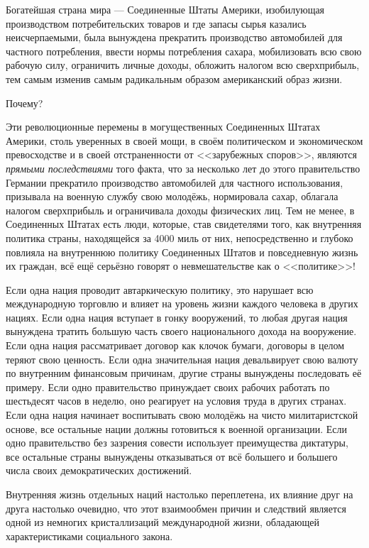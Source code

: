 Богатейшая страна мира — Соединенные Штаты Америки, изобилующая производством потребительских товаров и где запасы сырья казались неисчерпаемыми, была вынуждена прекратить производство автомобилей для частного потребления, ввести нормы потребления сахара, мобилизовать всю свою рабочую силу, ограничить личные доходы, обложить налогом всю сверхприбыль, тем самым изменив самым радикальным образом американский образ жизни.
 
Почему?

Эти революционные перемены в могущественных Соединенных Штатах Америки, столь уверенных в своей мощи, в своём политическом и экономическом превосходстве и в своей отстраненности от <<зарубежных споров>>, являются \textit{прямыми последствиями} того факта, что за несколько лет до этого правительство Германии прекратило производство автомобилей для частного использования, призывала на военную службу свою молодёжь, нормировала сахар, облагала налогом сверхприбыль и ограничивала доходы физических лиц. Тем не менее, в Соединенных Штатах есть люди, которые, став свидетелями того, как внутренняя политика страны, находящейся за 4000 миль от них, непосредственно и глубоко повлияла на внутреннюю политику Соединенных Штатов и повседневную жизнь их граждан, всё ещё серьёзно говорят о невмешательстве как о <<политике>>!
 
Если одна нация проводит автаркическую политику, это нарушает всю международную торговлю и влияет на уровень жизни каждого человека в других нациях. Если одна нация вступает в гонку вооружений, то любая другая нация вынуждена тратить большую часть своего национального дохода на вооружение. Если одна нация рассматривает договор как клочок бумаги, договоры в целом теряют свою ценность. Если одна значительная нация девальвирует свою валюту по внутренним финансовым причинам, другие страны вынуждены последовать её примеру. Если одно правительство принуждает своих рабочих работать по шестьдесят часов в неделю, оно реагирует на условия труда в других странах. Если одна нация начинает воспитывать свою молодёжь на чисто милитаристской основе, все остальные нации должны готовиться к военной организации. Если одно правительство без зазрения совести использует преимущества диктатуры, все остальные страны вынуждены отказываться от всё большего и большего числа своих демократических достижений.

Внутренняя жизнь отдельных наций настолько переплетена, их влияние друг на друга настолько очевидно, что этот взаимообмен причин и следствий является одной из немногих кристаллизаций международной жизни, обладающей характеристиками социального закона.
 
